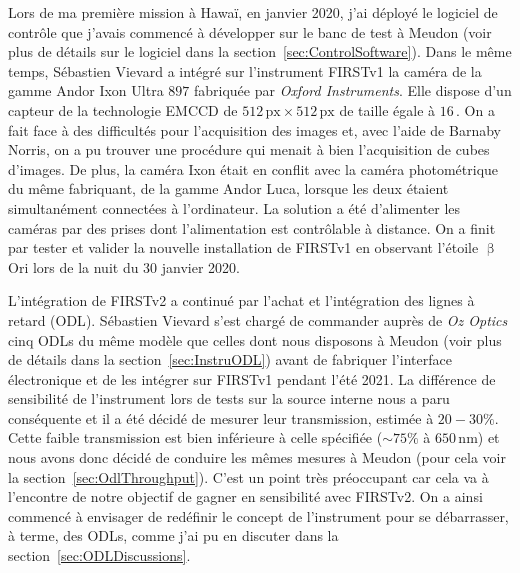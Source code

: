 Lors de ma première mission à Hawaï, en janvier 2020, j'ai déployé le logiciel de contrôle que j'avais commencé à développer sur le banc de test à Meudon (voir plus de détails sur le logiciel dans la section~\ref{sec:ControlSoftware}). Dans le même temps, Sébastien Vievard a intégré sur l'instrument \ac{FIRSTv1} la caméra de la gamme Andor Ixon Ultra $897$ fabriquée par \textit{Oxford Instruments}. Elle dispose d'un capteur de la technologie \acrfull{EMCCD} de $512 \,\text{px} \times 512\,\text{px}$ de taille égale à $16 \,$\um. On a fait face à des difficultés pour l'acquisition des images et, avec l'aide de Barnaby Norris, on a pu trouver une procédure qui menait à bien l'acquisition de cubes d'images. De plus, la caméra Ixon était en conflit avec la caméra photométrique du même fabriquant, de la gamme Andor Luca, lorsque les deux étaient simultanément connectées à l'ordinateur. La solution a été d'alimenter les caméras par des prises dont l'alimentation est contrôlable à distance. On a finit par tester et valider la nouvelle installation de \ac{FIRSTv1} en observant l'étoile $\upbeta$ Ori lors de la nuit du 30 janvier 2020.

L'intégration de \ac{FIRSTv2} a continué par l'achat et l'intégration des lignes à retard (\acrfull{ODL}). Sébastien Vievard s'est chargé de commander auprès de \textit{Oz Optics} cinq \ac{ODL}s du même modèle que celles dont nous disposons à Meudon (voir plus de détails dans la section~\ref{sec:InstruODL}) avant de fabriquer l'interface électronique et de les intégrer sur \ac{FIRSTv1} pendant l'été 2021. La différence de sensibilité de l'instrument lors de tests sur la source interne nous a paru conséquente et il a été décidé de mesurer leur transmission, estimée à $20 - 30 \%$. Cette faible transmission est bien inférieure à celle spécifiée ($\sim 75 \%$ à $650 \,$nm) et nous avons donc décidé de conduire les mêmes mesures à Meudon (pour cela voir la section~\ref{sec:OdlThroughput}). C'est un point très préoccupant car cela va à l'encontre de notre objectif de gagner en sensibilité avec \ac{FIRSTv2}. On a ainsi commencé à envisager de redéfinir le concept de l'instrument pour se débarrasser, à terme, des \ac{ODL}s, comme j'ai pu en discuter dans la section~\ref{sec:ODLDiscussions}.

